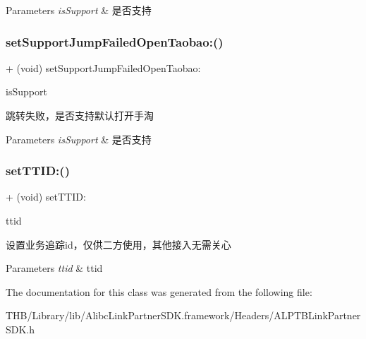 \begin{DoxyParams}{Parameters}
{\em is\+Support} & 是否支持 \\
\hline
\end{DoxyParams}
\mbox{\label{interface_a_l_p_t_b_link_partner_s_d_k_af26754e9b04c6111da401e2923127686}} 
\subsubsection{\texorpdfstring{set\+Support\+Jump\+Failed\+Open\+Taobao\+:()}{setSupportJumpFailedOpenTaobao:()}}
{\footnotesize\ttfamily + (void) set\+Support\+Jump\+Failed\+Open\+Taobao\+: \begin{DoxyParamCaption}\item[{(B\+O\+OL)}]{is\+Support }\end{DoxyParamCaption}}

跳转失败，是否支持默认打开手淘


\begin{DoxyParams}{Parameters}
{\em is\+Support} & 是否支持 \\
\hline
\end{DoxyParams}
\mbox{\label{interface_a_l_p_t_b_link_partner_s_d_k_a4ab65c468f9f7dc95ff4189034b56992}} 
\subsubsection{\texorpdfstring{set\+T\+T\+I\+D\+:()}{setTTID:()}}
{\footnotesize\ttfamily + (void) set\+T\+T\+I\+D\+: \begin{DoxyParamCaption}\item[{(nonnull N\+S\+String $\ast$)}]{ttid }\end{DoxyParamCaption}}

设置业务追踪id，仅供二方使用，其他接入无需关心


\begin{DoxyParams}{Parameters}
{\em ttid} & ttid \\
\hline
\end{DoxyParams}


The documentation for this class was generated from the following file\+:\begin{DoxyCompactItemize}
\item 
T\+H\+B/\+Library/lib/\+Alibc\+Link\+Partner\+S\+D\+K.\+framework/\+Headers/A\+L\+P\+T\+B\+Link\+Partner\+S\+D\+K.\+h\end{DoxyCompactItemize}
